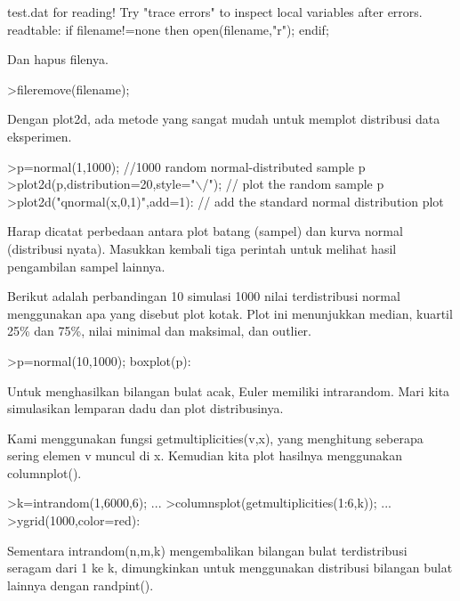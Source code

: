 \documentclass{article}
\begin{document}
\begin{eulernotebook}
\begin{eulercomment}
\begin{eulercomment}
\begin{euleroutput}
  test.dat
  for reading!
  Try "trace errors" to inspect local variables after errors.
  readtable:
      if filename!=none then open(filename,"r"); endif;
\end{euleroutput}
\begin{eulercomment}
Dan hapus filenya.
\end{eulercomment}
\begin{eulerprompt}
>fileremove(filename);
\end{eulerprompt}
\begin{eulercomment}
Dengan plot2d, ada metode yang sangat mudah untuk memplot distribusi
data eksperimen.
\end{eulercomment}
\begin{eulerprompt}
>p=normal(1,1000); //1000 random normal-distributed sample p
>plot2d(p,distribution=20,style="\(\backslash\)/"); // plot the random sample p
>plot2d("qnormal(x,0,1)",add=1): // add the standard normal distribution plot
\end{eulerprompt}
\begin{eulercomment}
Harap dicatat perbedaan antara plot batang (sampel) dan kurva normal
(distribusi nyata). Masukkan kembali tiga perintah untuk melihat hasil
pengambilan sampel lainnya.
\end{eulercomment}
\begin{eulercomment}
Berikut adalah perbandingan 10 simulasi 1000 nilai terdistribusi
normal menggunakan apa yang disebut plot kotak. Plot ini menunjukkan
median, kuartil 25\% dan 75\%, nilai minimal dan maksimal, dan outlier.
\end{eulercomment}
\begin{eulerprompt}
>p=normal(10,1000); boxplot(p):
\end{eulerprompt}
\begin{eulercomment}
Untuk menghasilkan bilangan bulat acak, Euler memiliki intrarandom.
Mari kita simulasikan lemparan dadu dan plot distribusinya.

Kami menggunakan fungsi getmultiplicities(v,x), yang menghitung
seberapa sering elemen v muncul di x. Kemudian kita plot hasilnya
menggunakan columnplot().
\end{eulercomment}
\begin{eulerprompt}
>k=intrandom(1,6000,6);  ...
>columnsplot(getmultiplicities(1:6,k));  ...
>ygrid(1000,color=red):
\end{eulerprompt}
\begin{eulercomment}
Sementara intrandom(n,m,k) mengembalikan bilangan bulat terdistribusi
seragam dari 1 ke k, dimungkinkan untuk menggunakan distribusi
bilangan bulat lainnya dengan randpint().


\end{eulercomment}
\end{eulercomment}
\end{eulercomment}
\end{eulernotebook}
\end{document}
